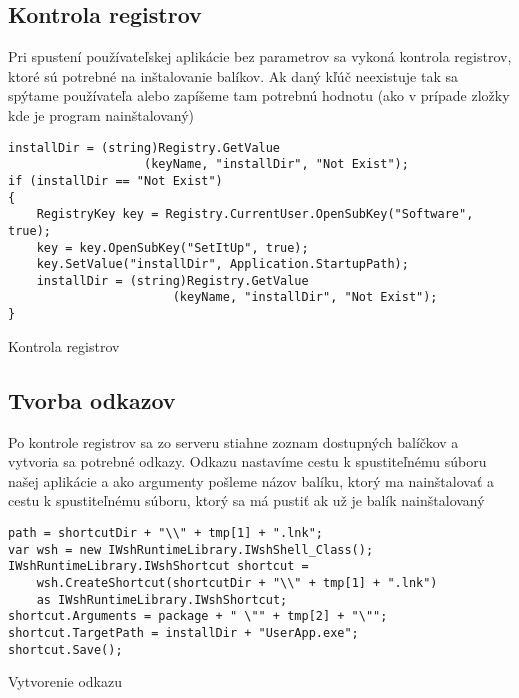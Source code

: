 \subsection{Kontrola registrov}
Pri spustení používateľskej aplikácie bez parametrov sa vykoná kontrola registrov, ktoré sú potrebné na inštalovanie balíkov. Ak daný kľúč neexistuje tak sa spýtame používateľa alebo zapíšeme tam potrebnú hodnotu (ako v prípade zložky kde je program nainštalovaný)

\begin{listing}
\begin{verbatim}
installDir = (string)Registry.GetValue
                   (keyName, "installDir", "Not Exist");
if (installDir == "Not Exist")
{
    RegistryKey key = Registry.CurrentUser.OpenSubKey("Software", true);
    key = key.OpenSubKey("SetItUp", true);
    key.SetValue("installDir", Application.StartupPath);
    installDir = (string)Registry.GetValue
                       (keyName, "installDir", "Not Exist");
}      
\end{verbatim}
\caption{Kontrola registrov}
\label{lst:regcheck}
\end{listing}

\subsection{Tvorba odkazov}
Po kontrole registrov sa zo serveru stiahne zoznam dostupných balíčkov a vytvoria sa potrebné odkazy. Odkazu nastavíme cestu k spustiteľnému súboru našej aplikácie a ako argumenty pošleme názov balíku, ktorý ma nainštalovať a cestu k spustiteľnému súboru, ktorý sa má pustiť ak už je balík nainštalovaný

\begin{listing}
\begin{verbatim}
path = shortcutDir + "\\" + tmp[1] + ".lnk";
var wsh = new IWshRuntimeLibrary.IWshShell_Class();
IWshRuntimeLibrary.IWshShortcut shortcut = 
    wsh.CreateShortcut(shortcutDir + "\\" + tmp[1] + ".lnk")
    as IWshRuntimeLibrary.IWshShortcut;
shortcut.Arguments = package + " \"" + tmp[2] + "\"";
shortcut.TargetPath = installDir + "UserApp.exe";
shortcut.Save();
\end{verbatim}
\caption{Vytvorenie odkazu}
\label{lst:shortcut}
\end{listing}


